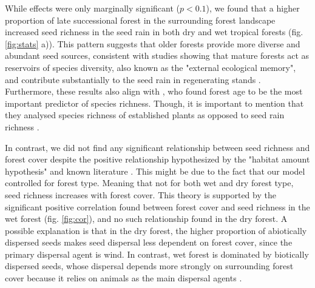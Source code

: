 While effects were only marginally significant ($p<0.1$), we found that a higher proportion of late successional forest in the surrounding forest landscape increased seed richness in the seed rain in both dry and wet tropical forests (fig. \ref{fig:stats} a)). This pattern suggests that older forests provide more diverse and abundant seed sources, consistent with studies showing that mature forests act as reservoirs of species diversity, also known as the "external ecological memory", and contribute substantially to the seed rain in regenerating stands \citep{martinez-ramosNaturalForestRegeneration2016, chazdonNaturalRegenerationTool2016, arroyo-rodriguezMultipleSuccessionalPathways2017}. Furthermore, these results also align with \cite{goosemForestAgeIsolation2016}, who found forest age to be the most important predictor of species richness. Though, it is important to mention that they analysed species richness of established plants as opposed to seed rain richness \citep{goosemForestAgeIsolation2016}. 

In contrast, we did not find any significant relationship between seed richness and forest cover despite the positive relationship hypothesized by the "habitat amount hypothesis"  \citep{fahrig2013rethinking} and known literature \citep{arroyo-rodriguezLandscapescaleForestCover2023a, PEREZCARDENAS2021118818, arroyo-rodriguezMultipleSuccessionalPathways2017}. This might be due to the fact that our model controlled for forest type. Meaning that not for both wet and dry forest type, seed richness increases with forest cover. This theory is supported by the significant positive correlation found between forest cover and seed richness in the wet forest (fig. \ref{fig:cor}), and no such relationship found in the dry forest. A possible explanation is that in the dry forest, the higher proportion of abiotically dispersed seeds makes seed dispersal less dependent on forest cover, since the primary dispersal agent is wind. %
In contrast, wet forest is dominated by biotically dispersed seeds, whose dispersal depends more strongly on surrounding forest cover because it relies on animals as the main dispersal agents \citep{hordijkLandUseHistory2024}. 

